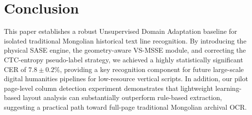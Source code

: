 \documentclass[11pt]{article}
\begin{document}
\section{Conclusion}
This paper establishes a robust Unsupervised Domain Adaptation baseline for isolated traditional Mongolian historical text line recognition. By introducing the physical SASE engine, the geometry-aware VS-MSSE module, and correcting the CTC-entropy pseudo-label strategy, we achieved a highly statistically significant CER of $7.8 \pm 0.2\%$, providing a key recognition component for future large-scale digital humanities pipelines for low-resource vertical scripts. In addition, our pilot page-level column detection experiment demonstrates that lightweight learning-based layout analysis can substantially outperform rule-based extraction, suggesting a practical path toward full-page traditional Mongolian archival OCR.
\end{document}
